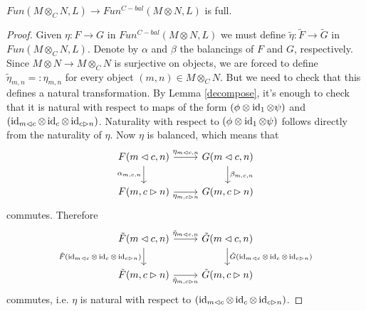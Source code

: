 \begin{lemma}

$Fun(M\otimes_C N,L)\to Fun^{C-bal}(M\otimes N,L)$ is full.\end{lemma}
\begin{proof}

Given $\eta:F\to G$ in $Fun^{C-bal}(M\otimes N,L)$ we must define $\tilde{\eta}:\tilde{F}\to\tilde{G}$ in $Fun(M\otimes_C N,L)$. Denote by $\alpha$ and $\beta$ the balancings of $F$ and $G$, respectively. Since $M\otimes N\to M\otimes_C N$ is surjective on objects, we are forced to define $\tilde{\eta}_{m,n}=:\eta_{m,n}$ for every object $(m,n)\in M\otimes_C N$. But we need to check that this defines a natural transformation. By Lemma \ref{decompose}, it's enough to check that it is natural with respect to maps of the form $(\phi\otimes\operatorname{id}_1\otimes\psi)$ and $(\operatorname{id}_{m\lhd c}\otimes\operatorname{id}_c\otimes\operatorname{id}_{c\rhd n})$. Naturality with respect to $(\phi\otimes\operatorname{id}_1\otimes\psi)$ follows directly from the naturality of $\eta$. Now $\eta$ is balanced, which means that \[\begin{tikzcd}
	{F(m\lhd c, n)} & {G(m\lhd c, n)} \\
	{F(m,c\rhd n)} & {G(m,c\rhd n)}
	\arrow["{\eta_{m\lhd c, n}}", from=1-1, to=1-2]
	\arrow["{\alpha_{m,c,n}}"', from=1-1, to=2-1]
	\arrow["{\beta_{m,c,n}}", from=1-2, to=2-2]
	\arrow["{\eta_{m,c\rhd n}}"', from=2-1, to=2-2]
\end{tikzcd}\] commutes. Therefore \[\begin{tikzcd}
	{\tilde{F}(m\lhd c, n)} & {\tilde{G}(m\lhd c, n)} \\
	{\tilde{F}(m,c\rhd n)} & {\tilde{G}(m,c\rhd n)}
	\arrow["{\tilde{\eta}_{m\lhd c, n}}", from=1-1, to=1-2]
	\arrow["{\tilde{F}(\id_{m\lhd c}\otimes\id_c\otimes\id_{c\rhd n})}"', from=1-1, to=2-1]
	\arrow["{\tilde{G}(\id_{m\lhd c}\otimes\id_c\otimes\id_{c\rhd n})}", from=1-2, to=2-2]
	\arrow["{\tilde{\eta}_{m,c\rhd n}}"', from=2-1, to=2-2]
\end{tikzcd}\] commutes, i.e. $\eta$ is natural with respect to $(\operatorname{id}_{m\lhd c}\otimes\operatorname{id}_c\otimes\operatorname{id}_{c\rhd n})$. \end{proof}





